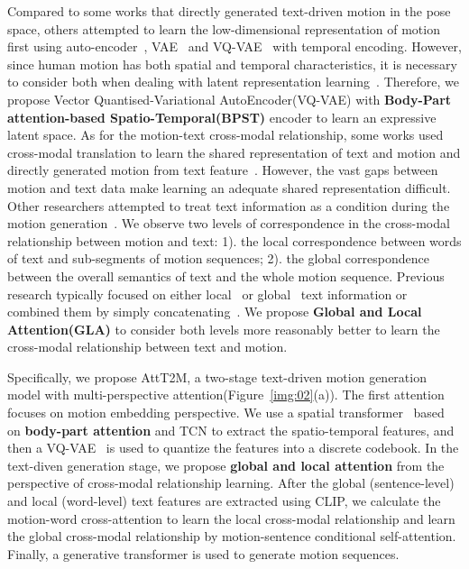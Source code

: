 \documentclass[10pt,twocolumn,letterpaper]{article}
\begin{document}
Compared to some works that directly generated text-driven motion in the pose space\cite{ahuja2019language2pose,ahn2018text2action,bhattacharya2021text2gestures,zhang2022motiondiffuse,tevet2023human}, others attempted to learn the low-dimensional representation of motion first using auto-encoder~\cite{guo2022generating}, VAE~\cite{chen2023mld} and VQ-VAE~\cite{zhang2023t2m} with temporal encoding. However, since human motion has both spatial and temporal characteristics, it is necessary to consider both when dealing with latent representation learning~\cite{zhong2022spatio,yan2018spatial}. Therefore, we propose Vector Quantised-Variational AutoEncoder(VQ-VAE) with \textbf{Body-Part attention-based Spatio-Temporal(BPST)} encoder to learn an expressive latent space. As for the motion-text cross-modal relationship, some works used cross-modal translation to learn the shared representation of text and motion and directly generated motion from text feature~\cite{ahuja2019language2pose,ahn2018text2action,petrovich2022temos,athanasiou2022teach}. However, the vast gaps between motion and text data make learning an adequate shared representation difficult. Other researchers attempted to treat text information as a condition during the motion generation~\cite{guo2022generating,zhang2023t2m,chen2023mld,zhang2022motiondiffuse,tevet2023human,guo2022tm2t}. We observe two levels of correspondence in the cross-modal relationship between motion and text: 1). the local correspondence between words of text and sub-segments of motion sequences; 2). the global correspondence between the overall semantics of text and the whole motion sequence. Previous research typically focused on either local~\cite{zhang2022motiondiffuse} or global~\cite{zhang2023t2m, tevet2023human} text information or combined them by simply concatenating~\cite{guo2022generating}. We propose \textbf{Global and Local Attention(GLA)} to consider both levels more reasonably better to learn the cross-modal relationship between text and motion.

Specifically, we propose AttT2M, a two-stage text-driven motion generation model with multi-perspective attention(Figure~\ref{img:02}(a)). The first attention focuses on motion embedding perspective. We use a spatial transformer~\cite{vaswani2017attention} based on \textbf{body-part attention} and TCN to extract the spatio-temporal features, and then a VQ-VAE~\cite{van2017neural} is used to quantize the features into a discrete codebook. In the text-diven generation stage, we propose \textbf{global and local attention} from the perspective of cross-modal relationship learning. After the global (sentence-level) and local (word-level) text features are extracted using CLIP, we calculate the motion-word cross-attention to learn the local cross-modal relationship and learn the global cross-modal relationship by motion-sentence conditional self-attention. Finally, a generative transformer is used to generate motion sequences.
\end{document}
